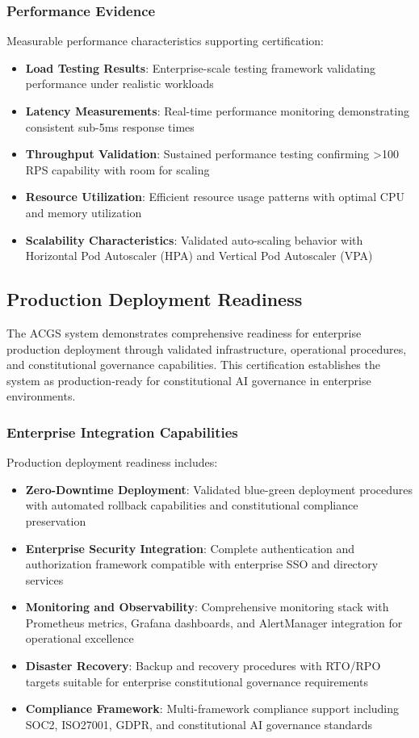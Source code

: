 \subsubsection{Performance Evidence}
Measurable performance characteristics supporting certification:
\begin{itemize}[leftmargin=*,itemsep=1pt,parsep=1pt]
    \item \textbf{Load Testing Results}: Enterprise-scale testing framework validating performance under realistic workloads
    \item \textbf{Latency Measurements}: Real-time performance monitoring demonstrating consistent sub-5ms response times
    \item \textbf{Throughput Validation}: Sustained performance testing confirming >100 RPS capability with room for scaling
    \item \textbf{Resource Utilization}: Efficient resource usage patterns with optimal CPU and memory utilization
    \item \textbf{Scalability Characteristics}: Validated auto-scaling behavior with Horizontal Pod Autoscaler (HPA) and Vertical Pod Autoscaler (VPA)
\end{itemize}

\subsection{Production Deployment Readiness}
\label{subsec:deployment_readiness}

The ACGS system demonstrates comprehensive readiness for enterprise production deployment through validated infrastructure, operational procedures, and constitutional governance capabilities. This certification establishes the system as production-ready for constitutional AI governance in enterprise environments.

\subsubsection{Enterprise Integration Capabilities}
Production deployment readiness includes:
\begin{itemize}[leftmargin=*,itemsep=2pt,parsep=1pt]
    \item \textbf{Zero-Downtime Deployment}: Validated blue-green deployment procedures with automated rollback capabilities and constitutional compliance preservation
    \item \textbf{Enterprise Security Integration}: Complete authentication and authorization framework compatible with enterprise SSO and directory services
    \item \textbf{Monitoring and Observability}: Comprehensive monitoring stack with Prometheus metrics, Grafana dashboards, and AlertManager integration for operational excellence
    \item \textbf{Disaster Recovery}: Backup and recovery procedures with RTO/RPO targets suitable for enterprise constitutional governance requirements
    \item \textbf{Compliance Framework}: Multi-framework compliance support including SOC2, ISO27001, GDPR, and constitutional AI governance standards
\end{itemize}

